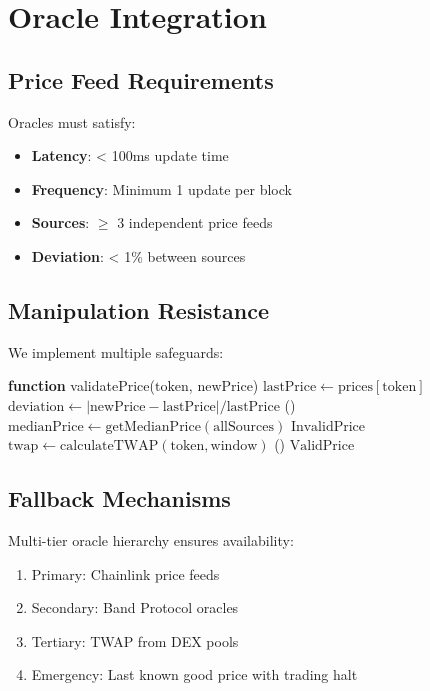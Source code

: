 \section{Oracle Integration}


\subsection{Price Feed Requirements}

Oracles must satisfy:
\begin{itemize}
    \item \textbf{Latency}: < 100ms update time
    \item \textbf{Frequency}: Minimum 1 update per block
    \item \textbf{Sources}: $\geq$ 3 independent price feeds
    \item \textbf{Deviation}: < 1\% between sources
\end{itemize}

\subsection{Manipulation Resistance}

We implement multiple safeguards:

\begin{algorithm}
\caption{Oracle Price Validation}
\begin{algorithmic}[1]
\STATE \textbf{function} validatePrice($\text{token}$, $\text{newPrice}$)
\STATE $\text{lastPrice} \gets \text{prices}[\text{token}]$
\STATE $\text{deviation} \gets |\text{newPrice} - \text{lastPrice}| / \text{lastPrice}$
    \STATE {}()
    \STATE $\text{medianPrice} \gets \text{getMedianPrice}(\text{allSources})$
        \RETURN $\text{InvalidPrice}$
    \ENDIF
\ENDIF
\STATE $\text{twap} \gets \text{calculateTWAP}(\text{token}, \text{window})$
    \STATE {}()
\ENDIF
\RETURN $\text{ValidPrice}$
\end{algorithmic}
\end{algorithm}

\subsection{Fallback Mechanisms}

Multi-tier oracle hierarchy ensures availability:

\begin{enumerate}
    \item Primary: Chainlink price feeds
    \item Secondary: Band Protocol oracles
    \item Tertiary: TWAP from DEX pools
    \item Emergency: Last known good price with trading halt
\end{enumerate}

